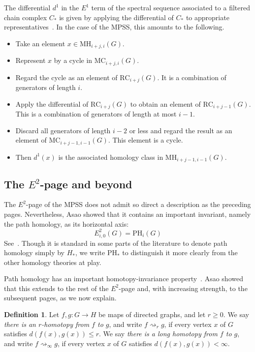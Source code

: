 \documentclass[a4paper, 11 pt, oneside, reqno]{amsart}
\numberwithin{lemma}{section}
\theoremstyle{definition}
\newtheorem{definition}[lemma]{Definition}
\newcommand{\demph}[1]{\emph{#1}}
\newcommand{\RC}{\mathrm{RC}}
\newcommand{\MC}{\mathrm{MC}}
\newcommand{\MH}{\mathrm{MH}}
\newcommand{\PH}{\mathrm{PH}}
\begin{document}
The differential $d^1$ in the $E^1$ term of the spectral sequence
associated to a filtered chain complex $C_\ast$
is given by applying the differential of $C_\ast$
to appropriate representatives~\cite[5.4.6]{Weibel}.
In the case of the MPSS, this amounts to the following.
\begin{itemize}
    \item
    Take an element $x\in\MH_{i+j,i}(G)$.
    \item
    Represent $x$ by a cycle in $\MC_{i+j,i}(G)$.
    \item
    Regard the cycle as an element of $\RC_{i+j}(G)$.
    It is a combination of generators of length $i$.
    \item
    Apply the differential of $\RC_{i+j}(G)$
    to obtain an element of $\RC_{i+j-1}(G)$.
    This is a combination of generators of length at most $i-1$.
    \item
    Discard all generators of length $i-2$ or less 
    and regard the result as an element of $\MC_{i+j-1,i-1}(G)$.
    This element is a cycle.
    \item
    Then $d^1(x)$ is the associated homology class in
    $\MH_{i+j-1,i-1}(G)$.
\end{itemize}

\subsection{The $E^2$-page and beyond}\label{subsection:E2}
The $E^2$-page of the MPSS does not admit so direct a
description as the preceding pages.
Nevertheless, Asao showed  that it contains an important
invariant, namely the path homology, as its horizontal axis:
\[
    E^2_{i,0}(G) = \PH_i(G)
\]
See~\cite[Theorem~1.2]{Asao-path}. Though it is standard in some parts of the literature to denote path homology simply by \(H_\ast\), we write \(\PH_\ast\) to distinguish it more clearly from the other homology theories at play.

Path homology has an important homotopy-invariance property~\cite[Theorem~3.3]{PH-homotopy}. 
Asao showed that this extends to the rest of the $E^2$-page
and, with increasing strength, to the subsequent pages,
as we now explain.

\begin{definition}\label{def:r-homotopy}
    Let \(f,g\colon G \to H\) be maps of directed graphs, and let \(r \geq 0\). We say \demph{there is an \(r\)-homotopy from \(f\) to \(g\)}, and write \(f \rightsquigarrow_r g\), if every vertex $x$ of $G$ satisfies \(d(f(x),g(x)) \leq r\). We say \demph{there is a long homotopy from \(f\) to \(g\)}, and write \(f \rightsquigarrow_\infty g\), if every vertex $x$ of $G$ satisfies \(d(f(x),g(x)) < \infty\).
\end{definition}
\end{document}
